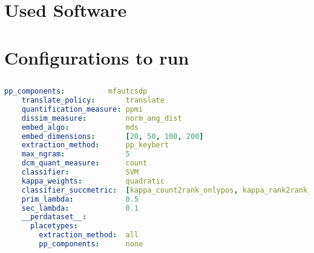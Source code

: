 \section{Used Software}



\section{Configurations to run \mainalgos}
\label{ap:yamls_for_origalgos}


% 

\subsection{\textcite{Derrac2015}}

\begin{lstlisting}[language=yaml, caption={YAML for \textcite{Derrac2015}}]
    pp_components:          mfautcsdp
    translate_policy:       translate
    quantification_measure: ppmi
    dissim_measure:         norm_ang_dist
    embed_algo:             mds
    embed_dimensions:       [20, 50, 100, 200]
    extraction_method:      pp_keybert
    max_ngram:              5                   
    dcm_quant_measure:      count
    classifier:             SVM
    kappa_weights:          quadratic
    classifier_succmetric:  [kappa_count2rank_onlypos, kappa_rank2rank_onlypos_min] 
    prim_lambda:            0.5
    sec_lambda:             0.1
    __perdataset__:
      placetypes:
        extraction_method:  all 
        pp_components:      none
\end{lstlisting}

